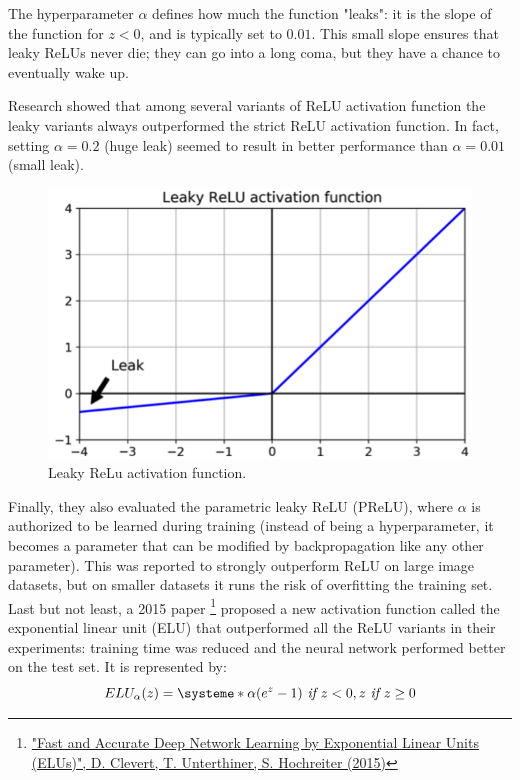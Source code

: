 \documentclass[12pt, letterpaper]{article}
\theoremstyle{definition}
\begin{document}
The hyperparameter $\alpha$ defines how much the function "leaks": it is the slope of the function for $z < 0$, and is typically set to $0.01$. This small slope ensures that leaky ReLUs never die; they can go into a long coma, but they have a chance to eventually wake up. 

Research showed that among several variants of ReLU activation function the leaky variants always outperformed the strict ReLU activation function. In fact, setting $\alpha= 0.2$ (huge leak) seemed to result in better performance than $\alpha = 0.01$ (small leak).
\begin{figure}
\centering
\includegraphics[scale=0.4]{img/lrelu}
\caption{Leaky ReLu activation function.}
\end{figure}
Finally, they also evaluated the parametric leaky ReLU (PReLU), where $\alpha$ is authorized to be learned during training (instead of being a hyperparameter, it becomes a parameter that can be modified by backpropagation like any other parameter). This was reported to strongly outperform ReLU on large image datasets, but on smaller datasets it runs the risk of overfitting the training set. Last but not least, a 2015 paper \footnote{\href{https://homl.info/50}{"Fast and Accurate Deep Network Learning by Exponential Linear Units (ELUs)",  D. Clevert, T. Unterthiner, S. Hochreiter (2015)}} proposed a new activation function called the exponential linear unit (ELU) that outperformed all the ReLU variants in their experiments: training time was reduced and the neural network performed better on the test set. It is represented by:
\begin{equation}
ELU_\alpha(z) = \systeme*{\alpha(e^z - 1) \textit{ if } {z<0} ,z \textit{ if } {z\ge 0}}
\end{equation}
\end{document}
